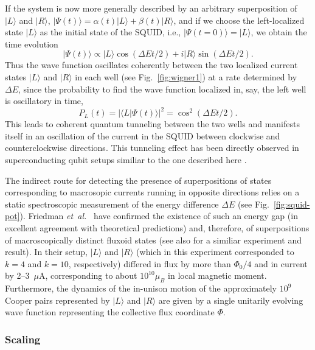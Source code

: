 \documentclass[12pt,aps,floatfix,amsmath,amssymb,showpacs,nofootinbib]{revtex4-2}
\newcommand{\be}{\begin{equation}} \newcommand{\ee}{\end{equation}}
\newcommand{\etal}{\emph{et~al.\ }}
\newcommand{\ket}[1]{\ensuremath{|{#1\rangle}}}
\newcommand{\braket}[2]{\ensuremath{{\langle #1}|{#2 \rangle}}}
\begin{document}
If the system is now more generally described by an arbitrary
superposition of $\ket{L}$ and $\ket{R}$, $\ket{\Psi(t)}= \alpha(t)
\ket{L} + \beta(t) \ket{R}$, and if we choose the left-localized state
$\ket{L}$ as the initial state of the SQUID, i.e., $\ket{\Psi(t=0)} =
\ket{L}$, we obtain the time evolution
%
\be
\ket{\Psi(t)} \propto \ket{L} \cos (\Delta E t / 2) + i \ket{R}
  \sin(\Delta E t / 2). 
\ee
%
Thus the wave function oscillates coherently between the two localized
current states $\ket{L}$ and $\ket{R}$ in each well (see
Fig.~\ref{fig:wigner1}) at a rate determined by $\Delta E$, since the
probability to find the wave function localized in, say, the left well
is oscillatory in time,
%
\be
P_L(t) = | \braket{L}{\Psi(t)} |^2 = \cos^2 (\Delta E t / 2).
\ee
%
This leads to coherent quantum tunneling between the two wells and
manifests itself in an oscillation of the current in the SQUID between
clockwise and counterclockwise directions. This tunneling effect has
been directly observed in superconducting qubit setups similiar to the
one described here
\cite{Nakamura:1999:ub,Korotkov:2001:mq,Korotkov:2001:my,Greenberg:2002:mi,%
  Martinis:2002:qq,Yu:2002:yb,Vion:2002:oo}.  

The indirect route for detecting the presence of superpositions of states
corresponding to macrosopic currents running in opposite directions
relies on a static spectroscopic measurement of the energy difference
$\Delta E$ (see Fig.~\ref{fig:squid-pot}). Friedman \etal
\cite{Friedman:2000:rr} have confirmed the existence of such an energy
gap (in excellent agreement with theoretical predictions) and,
therefore, of superpositions of macroscopically distinct fluxoid states
(see also \cite{Wal:2000:om} for a similiar experiment and
result). In their setup, $\ket{L}$ and $\ket{R}$ (which in this
experiment corresponded to $k=4$ and $k=10$, respectively) differed in
flux by more than $\Phi_0/4$ and in current by 2--3~$\mu$A,
corresponding to about $10^{10} \mu_B$ in local magnetic moment.
Furthermore, the dynamics of the in-unison motion of the approximately
$10^9$ Cooper pairs represented by $\ket{L}$ and $\ket{R}$ are given
by a single unitarily evolving wave function representing the
collective flux coordinate $\Phi$.


\subsubsection{Scaling}
\end{document}
